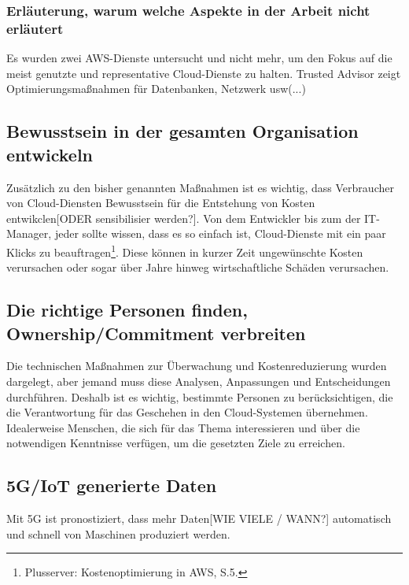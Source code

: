\subsubsection*{Erläuterung, warum welche Aspekte in der Arbeit nicht erläutert} 
Es wurden zwei AWS-Dienste untersucht und nicht mehr, um den Fokus auf die meist genutzte und representative Cloud-Dienste zu halten. Trusted Advisor zeigt Optimierungsmaßnahmen für Datenbanken, Netzwerk usw(...) 

\subsection*{Bewusstsein in der gesamten Organisation entwickeln}
Zusätzlich zu den bisher genannten Maßnahmen ist es wichtig, dass Verbraucher von Cloud-Diensten Bewusstsein für die Entstehung von Kosten entwikclen[ODER sensibilisier werden?]. Von dem Entwickler bis zum der IT-Manager, jeder sollte wissen, dass es so einfach ist, Cloud-Dienste mit ein paar Klicks zu beauftragen\footnote{Plusserver: Kostenoptimierung in AWS, S.5\cite{PS1}.}. Diese können in kurzer Zeit ungewünschte  Kosten verursachen oder sogar über Jahre hinweg wirtschaftliche Schäden verursachen. 
\\
\subsection*{Die richtige Personen finden, Ownership/Commitment verbreiten}
Die technischen Maßnahmen zur Überwachung und Kostenreduzierung wurden dargelegt, aber jemand muss diese Analysen, Anpassungen und Entscheidungen durchführen. 
Deshalb ist es wichtig, bestimmte Personen zu berücksichtigen, die die Verantwortung für das Geschehen in den Cloud-Systemen übernehmen. Idealerweise Menschen, die sich für das Thema interessieren und über die notwendigen Kenntnisse verfügen, um die gesetzten Ziele zu erreichen. 
\\
\subsection*{5G/IoT generierte Daten}
Mit 5G ist pronostiziert, dass mehr Daten[WIE VIELE / WANN?] automatisch und schnell von Maschinen produziert werden.
\\
